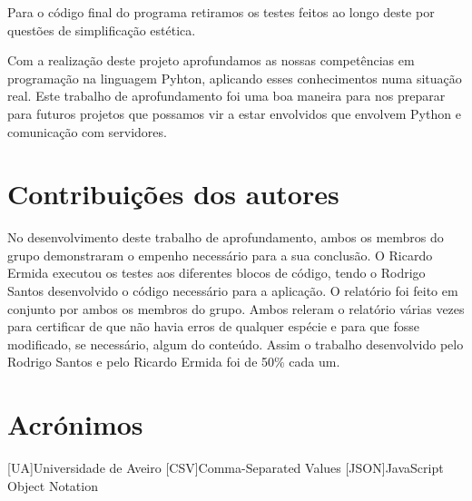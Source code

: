 \documentclass[a4paper]{report}
\begin{document}
Para o código final do programa retiramos os testes feitos ao longo deste por questões de simplificação estética.

Com a realização deste projeto aprofundamos as nossas competências em programação na linguagem Pyhton, aplicando esses conhecimentos numa situação real. Este trabalho de aprofundamento foi uma boa maneira para nos preparar para futuros projetos que possamos vir a estar envolvidos que envolvem Python e comunicação com servidores.

\chapter*{Contribuições dos autores}

No desenvolvimento deste trabalho de aprofundamento, ambos os membros do grupo demonstraram o empenho necessário para a sua conclusão.
O Ricardo Ermida executou os testes aos diferentes blocos de código, tendo o Rodrigo Santos desenvolvido o código necessário para a aplicação. O relatório foi feito em conjunto por ambos os membros do grupo. Ambos releram o relatório várias vezes para certificar de que não havia erros de qualquer espécie e para que fosse modificado, se necessário, algum do conteúdo.
Assim o trabalho desenvolvido pelo Rodrigo Santos e pelo Ricardo Ermida foi de 50\% cada um.


\chapter*{Acrónimos}
\begin{acronym}
[UA]{Universidade de Aveiro}
[CSV]{Comma-Separated Values}
[JSON]{JavaScript Object Notation}
\end{acronym}

\end{document}
